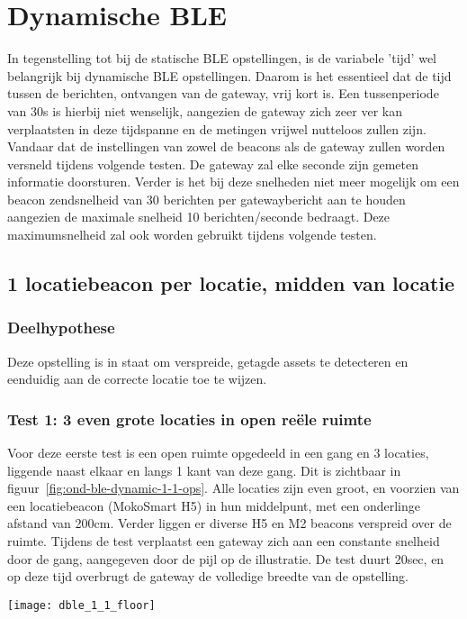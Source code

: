\section{Dynamische BLE}
In tegenstelling tot bij de statische BLE opstellingen, is de variabele 'tijd' wel belangrijk bij dynamische BLE opstellingen. Daarom is het essentieel dat de tijd tussen de berichten, ontvangen van de gateway, vrij kort is. Een tussenperiode van 30s is hierbij niet wenselijk, aangezien de gateway zich zeer ver kan verplaatsten in deze tijdspanne en de metingen vrijwel nutteloos zullen zijn. Vandaar dat de instellingen van zowel de beacons als de gateway zullen worden versneld tijdens volgende testen. De gateway zal elke seconde zijn gemeten informatie doorsturen. Verder is het bij deze snelheden niet meer mogelijk om een beacon zendsnelheid van 30 berichten per gatewaybericht aan te houden aangezien de maximale snelheid 10 berichten/seconde bedraagt. Deze maximumsnelheid zal ook worden gebruikt tijdens volgende testen.

\subsection{1 locatiebeacon per locatie, midden van locatie}
\label{sec:ond-ble-4}
\subsubsection{Deelhypothese}
Deze opstelling is in staat om verspreide, getagde assets te detecteren en eenduidig aan de correcte locatie toe te wijzen.

\subsubsection{Test 1: 3 even grote locaties in open reële ruimte}
\label{sec:ond-ble-4-1}
\begin{minipage}{0.55\textwidth}
Voor deze eerste test is een open ruimte opgedeeld in een gang en 3 locaties, liggende naast elkaar en langs 1 kant van deze gang. Dit is zichtbaar in figuur~\ref{fig:ond-ble-dynamic-1-1-ops}. Alle locaties zijn even groot, en voorzien van een locatiebeacon (MokoSmart H5) in hun middelpunt, met een onderlinge afstand van 200cm. Verder liggen er diverse H5 en M2 beacons verspreid over de ruimte. Tijdens de test verplaatst een gateway zich aan een constante snelheid door de gang, aangegeven door de pijl op de illustratie. De test duurt 20sec, en op deze tijd overbrugt de gateway de volledige breedte van de opstelling. 
\end{minipage}
\hfill
\begin{minipage}{0.42\textwidth}
	\texttt{[image: dble\_1\_1\_floor]}
	\label{fig:ond-ble-dynamic-1-1-ops}
\end{minipage}

